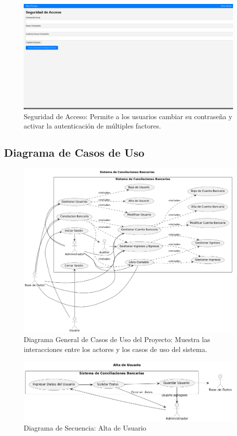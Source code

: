 \documentclass{article}
\begin{document}
\begin{figure}[H]
    \centering
    \includegraphics[width=\textwidth]{img/image9.png}
    \caption{Seguridad de Acceso: Permite a los usuarios cambiar su contraseña y activar la autenticación de múltiples factores.}
\end{figure}

\subsection{Diagrama de Casos de Uso}

\begin{figure}[H]
    \centering
    \includegraphics[width=\textwidth]{casos/UML-General.png}
    \caption{Diagrama General de Casos de Uso del Proyecto: Muestra las interacciones entre los actores y los casos de uso del sistema.}
\end{figure}

\begin{figure}[H]
    \centering
    \includegraphics[width=\textwidth]{casos/AltaUsuario.png}
    \caption{Diagrama de Secuencia: Alta de Usuario}
\end{figure}
\end{document}
